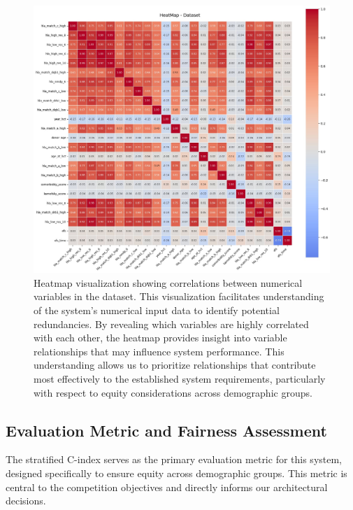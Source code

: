 \begin{figure}[H]
    \centering
    \includegraphics[width=1\textwidth]{figures/DatasetHeatmap.jpg}
    \caption{Heatmap visualization showing correlations between numerical variables in the dataset. This visualization facilitates understanding of the system's numerical input data to identify potential redundancies. By revealing which variables are highly correlated with each other, the heatmap provides insight into variable relationships that may influence system performance. This understanding allows us to prioritize relationships that contribute most effectively to the established system requirements, particularly with respect to equity considerations across demographic groups.}
    \label{fig:dataset_heatmap}
\end{figure}

\newpage

\subsection{Evaluation Metric and Fairness Assessment}

The stratified C-index serves as the primary evaluation metric for this system, designed specifically to ensure equity across demographic groups. This metric is central to the competition objectives and directly informs our architectural decisions.

